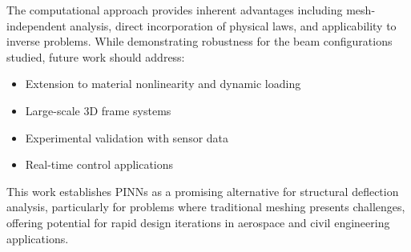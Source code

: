 \documentclass[12pt]{article}
\begin{document}
The computational approach provides inherent advantages including mesh-independent analysis, direct incorporation of physical laws, and applicability to inverse problems. While demonstrating robustness for the beam configurations studied, future work should address:

\begin{itemize}
	\item Extension to material nonlinearity and dynamic loading
\item Large-scale 3D frame systems
\item Experimental validation with sensor data
\item Real-time control applications
\end{itemize}

This work establishes PINNs as a promising alternative for structural deflection analysis, particularly for problems where traditional meshing presents challenges, offering potential for rapid design iterations in aerospace and civil engineering applications.

\pagebreak


\end{document}
